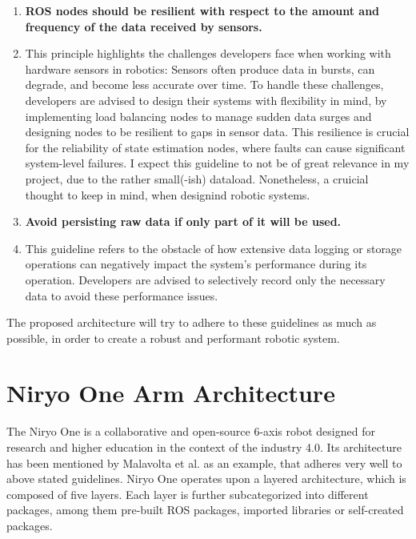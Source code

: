 \documentclass[%
paper=A4,               %
twoside=true,           %
openright,              %
11pt,                   %
bibliography=totoc,     %
titlepage=on,           %
DIV=12,                 %
BCOR=1.5cm,             %
parskip=half,            %
final
]{scrreprt}
\begin{document}
\begin{enumerate}[leftmargin=9mm, align=left]
		\item \textbf{ROS nodes should be resilient with respect to the amount and frequency of the data received by sensors.} 
		\item[] This principle highlights the challenges developers face when working with hardware sensors in robotics: Sensors often produce data in bursts, can degrade, and become less accurate over time. To handle these challenges, developers are advised to design their systems with flexibility in mind, by implementing load balancing nodes to manage sudden data surges and designing nodes to be resilient to gaps in sensor data. This resilience is crucial for the reliability of state estimation nodes, where faults can cause significant system-level failures. I expect this guideline to not be of great relevance in my project, due to the rather small(-ish) dataload. Nonetheless, a cruicial thought to keep in mind, when designind robotic systems. \autocite{malavoltaHowYouArchitect2020}
		
		\item \textbf{Avoid persisting raw data if only part of it will be used.}
		\item[] This guideline refers to the obstacle of how extensive data logging or storage operations can negatively impact the system's performance during its operation. Developers are advised to selectively record only the necessary data to avoid these performance issues. \autocite{malavoltaHowYouArchitect2020}
		
		
	\end{enumerate}
	
	The proposed architecture will try to adhere to these guidelines as much as possible, in order to create a robust and performant robotic system.
	
	
	\section{Niryo One Arm Architecture}
	The Niryo One is a collaborative and open-source 6-axis robot designed for research and higher education in the context of the industry 4.0.
	Its architecture has been mentioned by Malavolta et al. as an example, that adheres very well to above stated guidelines. \autocite{malavoltaHowYouArchitect2020} Niryo One operates upon a layered architecture, which is composed of five layers. Each layer is further subcategorized into different packages, among them pre-built ROS packages, imported libraries or self-created packages. \newline
	
\end{document}
